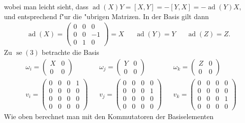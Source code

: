 \documentclass[paper=A4, twoside, chapterprefix=true, bibliography=totoc, headsepline]{scrbook}
\DeclareMathOperator{\ad}{ad}
\DeclareMathOperator{\se}{se}
\theoremstyle{nonumberbreak}
\theoremstyle{emptybreak}
\theoremstyle{break}
\begin{document}
wobei man leicht sieht, dass $\ad(X)Y = [X,Y] = -[Y,X] = - \ad(Y)X$, und entsprechend f"ur die "ubrigen Matrizen.
In der Basis gilt dann
\begin{align*}
	\ad(X) =
	\begin{pmatrix}
		0 & 0 & 0 \\
		0 & 0 & -1 \\
		0 & 1 & 0
	\end{pmatrix}
	=X
	&&
	\ad(Y) = Y
	&&
	\ad(Z) = Z.
\end{align*}
Zu $\se(3)$ betrachte die Basis
\begin{align*}
	&\omega_i =
	\left(\begin{array}{c|c}
		X & 0 \\ \hline
		0 & 0
	\end{array}\right)
	&&
	\omega_j =
	\left(\begin{array}{c|c}
		Y & 0 \\ \hline
		0 & 0
	\end{array}\right)
	&&
	\omega_k =
	\left(\begin{array}{c|c}
		Z & 0 \\ \hline
		0 & 0
	\end{array}\right)
	\\
	&v_i =
	\left(\begin{array}{ccc|c}
		0 & 0 & 0 & 1 \\
		0 & 0 & 0 & 0 \\
		0 & 0 & 0 & 0 \\ \hline
		0 & 0 & 0 & 0
	\end{array}\right)
	&&
	v_j =
	\left(\begin{array}{ccc|c}
		0 & 0 & 0 & 0 \\
		0 & 0 & 0 & 1 \\
		0 & 0 & 0 & 0 \\ \hline
		0 & 0 & 0 & 0
	\end{array}\right)
	&&
	v_k =
	\left(\begin{array}{ccc|c}
		0 & 0 & 0 & 0 \\
		0 & 0 & 0 & 0 \\
		0 & 0 & 0 & 1 \\ \hline
		0 & 0 & 0 & 0
	\end{array}\right)
\end{align*}
Wie oben berechnet man mit den Kommutatoren der Basiselementen
\end{document}
